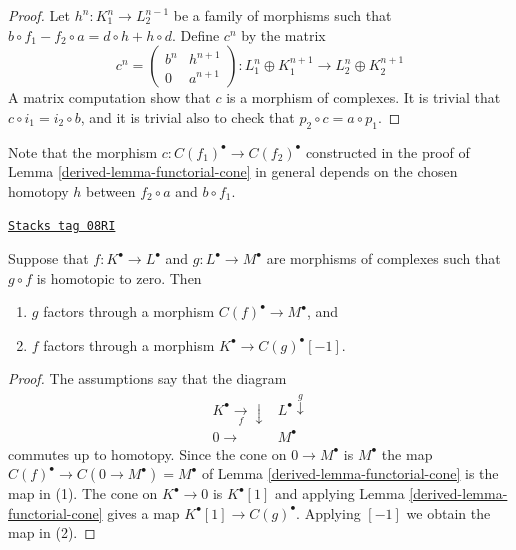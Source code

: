 \begin{proof}
Let $h^n : K_1^n \to L_2^{n - 1}$ be a family of morphisms such that
$b \circ f_1 - f_2 \circ a= d \circ h + h \circ d$.
Define $c^n$ by the matrix
$$
c^n =
\left(
\begin{matrix}
b^n & h^{n + 1} \\
0 & a^{n + 1}
\end{matrix}
\right) :
L_1^n \oplus K_1^{n + 1} \to L_2^n \oplus K_2^{n + 1}
$$
A matrix computation show that $c$ is a morphism of complexes.
It is trivial that $c \circ i_1 = i_2 \circ b$, and it is
trivial also to check that $p_2 \circ c = a \circ p_1$.
\end{proof}

Note that the morphism $c : C(f_1)^\bullet \to C(f_2)^\bullet$
constructed in the
proof of Lemma \ref{derived-lemma-functorial-cone} in general depends on the
chosen homotopy $h$ between $f_2 \circ a$ and $b \circ f_1$.

\begin{lemma}
\label{derived-lemma-map-from-cone}
\href{https://stacks.math.columbia.edu/tag/08RI}{\texttt{Stacks tag 08RI}}

Suppose that $f: K^\bullet \to L^\bullet$ and $g : L^\bullet \to M^\bullet$
are morphisms of complexes such that $g \circ f$ is homotopic to zero.
Then
\begin{enumerate}
\item $g$ factors through a morphism $C(f)^\bullet \to M^\bullet$, and
\item $f$ factors through a morphism $K^\bullet \to C(g)^\bullet[-1]$.
\end{enumerate}
\end{lemma}

\begin{proof}

The assumptions say that the diagram
$$
\begin{array}{cc}K^\bullet \underset{f}{\longrightarrow}\downarrow & L^\bullet \overset{g}{\downarrow} \\ 0 \longrightarrow & M^\bullet\end{array}
$$
commutes up to homotopy.
Since the cone on $0 \to M^\bullet$ is $M^\bullet$ the
map $C(f)^\bullet \to C(0 \to M^\bullet) = M^\bullet$
of Lemma \ref{derived-lemma-functorial-cone}
is the map in (1). The cone on $K^\bullet \to 0$ is
$K^\bullet[1]$ and applying Lemma \ref{derived-lemma-functorial-cone}
gives a map $K^\bullet[1] \to C(g)^\bullet$. Applying
$[-1]$ we obtain the map in (2).
\end{proof}

